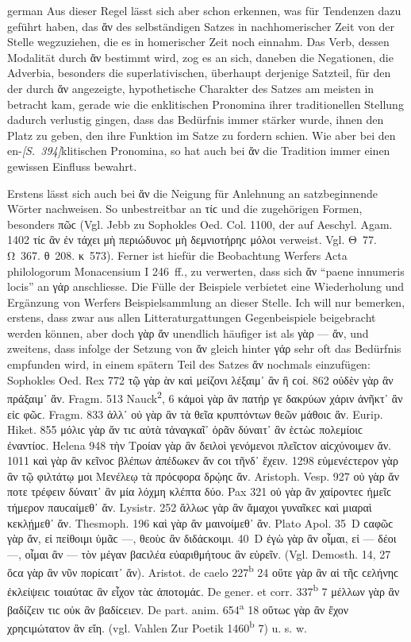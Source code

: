 \begin{otherlanguage*}{german}
Aus dieser Regel lässt sich aber schon erkennen, was für Tendenzen dazu geführt haben, das ἄν des selbständigen Satzes in nachhomerischer Zeit von der Stelle wegzuziehen, die es in homerischer Zeit noch einnahm. Das Verb, dessen Modalität durch ἄν bestimmt wird, zog es an sich, daneben die Negationen, die Adverbia, besonders die superlativischen, überhaupt derjenige Satzteil, für den der durch ἄν angezeigte, hypothetische Charakter des Satzes am meisten in betracht kam, gerade wie die enklitischen Pronomina ihrer traditionellen Stellung dadurch verlustig gingen, dass das Bedürfnis immer stärker wurde, ihnen den Platz zu geben, den ihre Funktion im Satze zu fordern schien. Wie aber bei den en-\hypertarget{p394}{\emph{[S.~394]}}\label{p394}klitischen Pronomina, so hat auch bei ἄν die Tradition immer einen gewissen Einfluss bewahrt.

\largerpage
Erstens lässt sich auch bei ἄν die Neigung für Anlehnung an satzbeginnende Wörter nachweisen. So unbestreitbar an τίϲ und die zugehörigen Formen, besonders πῶϲ (Vgl. Jebb zu Sophokles Oed. Col. 1100, der auf Aeschyl. Agam. 1402 τίϲ ἂν ἐν τάχει μὴ περιώδυνοϲ μὴ δεμνιοτήρηϲ μόλοι verweist. Vgl. Θ~77. Ω~367. θ~208. κ~573). Ferner ist hiefür die Beobachtung Werfers Acta philologorum Monacensium I 246~ff., zu verwerten, dass sich ἄν “paene innumeris locis” an γάρ anschliesse. Die Fülle der Beispiele verbietet eine Wiederholung und Ergänzung von Werfers Beispielsammlung an dieser Stelle. Ich will nur bemerken, erstens, dass zwar aus allen Litteraturgattungen Gegenbeispiele beigebracht werden können, aber doch γὰρ ἄν unendlich häufiger ist als γὰρ — ἄν, und zweitens, dass infolge der Setzung von ἄν gleich hinter γάρ sehr oft das Bedürfnis empfunden wird, in einem spätern Teil des Satzes ἄν nochmals einzufügen: Sophokles Oed. Rex 772 τῷ γὰρ ὰν καὶ μείζονι λέξαιμ᾽ ἂν ἢ ϲοί. 862 οὐδὲν γὰρ ἂν πράξαιμ᾽ ἄν. Fragm. 513 Nauck\textsuperscript{2}, 6 κἀμοὶ γὰρ ἂν πατήρ γε δακρύων χάριν ἀνῆκτ᾽ ἂν εἰϲ φῶϲ. Fragm. 833 ἀλλ᾽ οὐ γὰρ ἂν τὰ θεῖα κρυπτόντων θεῶν μάθοιϲ ἄν. Eurip. Hiket. 855 μόλιϲ γὰρ ἄν τιϲ αὐτὰ τἀναγκαῖ᾽ ὁρᾶν δύναιτ᾽ ἂν ἑϲτὼϲ πολεμίοιϲ ἐναντίοϲ. Helena 948 τὴν Τροίαν γὰρ ἂν δειλοὶ γενόμενοι πλεῖϲτον αἰϲχύνοιμεν ἄν. 1011 καὶ γὰρ ἂν κεῖνοϲ βλέπων ἀπέδωκεν ἄν ϲοι τῆνδ᾽ ἔχειν. 1298 εὐμενέϲτερον γὰρ ἂν τῷ φιλτάτῳ μοι Μενέλεῳ τὰ πρόϲφορα δρῴηϲ ἄν. Aristoph. Vesp. 927 οὐ γὰρ ἄν ποτε τρέφειν δύναιτ᾽ ἂν μία λόχμη κλέπτα δύο. Pax 321 οὐ γὰρ ἂν χαίροντεϲ ἡμεῖϲ τήμερον παυϲαίμεθ᾽ ἄν. Lysistr. 252 ἄλλωϲ γὰρ ἂν ἄμαχοι γυναῖκεϲ καὶ μιαραὶ κεκλῄμεθ᾽ ἄν. Thesmoph. 196 καὶ γὰρ ἂν μαινοίμεθ᾽ ἄν. Plato Apol. 35~D ϲαφῶϲ γὰρ ἄν, εἰ πείθοιμι ὑμᾶϲ —, θεοὺϲ ἂν διδάϲκοιμι. 40~D ἐγὼ γὰρ ἂν οἶμαι, εἰ — δέοι —, οἶμαι ἂν — τὸν μέγαν βαϲιλέα εὐαριθμήτουϲ ἂν εὑρεῖν. (Vgl. Demosth. 14, 27 ὅϲα γὰρ ἂν νῦν πορίϲαιτ᾽ ἄν). Aristot. de caelo 227\textsuperscript{b} 24 οὔτε γὰρ ἂν αἱ τῆϲ ϲελήνηϲ ἐκλείψειϲ τοιαύταϲ ἂν εἶχον τὰϲ ἀποτομάϲ. De gener. et corr. 337\textsuperscript{b} 7 μέλλων γὰρ ἂν βαδίζειν τιϲ οὐκ ἂν βαδίϲειεν. De part. anim. 654\textsuperscript{a} 18 οὕτωϲ γὰρ ἂν ἔχον χρηϲιμώτατον ἂν εἴη. (vgl. Vahlen Zur Poetik 1460\textsuperscript{b} 7) u. s. w.


\end{otherlanguage*}
